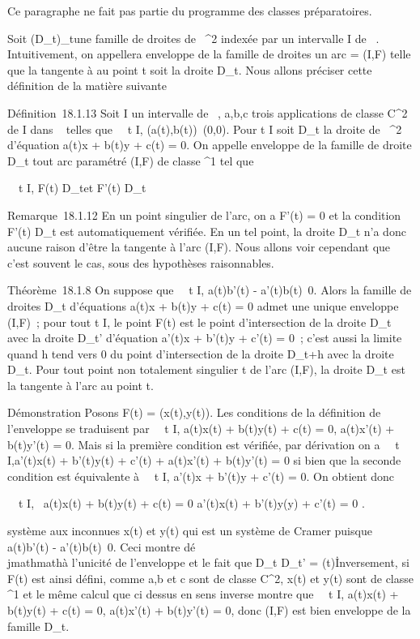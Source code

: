 \documentclass[]{article}
\begin{document}
Ce paragraphe ne fait pas partie du programme des classes préparatoires.

Soit (D_t)_t\inI une famille de droites de
~^2 indexée par un intervalle I de ~. Intuitivement, on
appellera enveloppe de la famille de droites un arc \Gamma = (I,F) telle que
la tangente à \Gamma au point t soit la droite D_t. Nous allons
préciser cette définition de la matière suivante

Définition~18.1.13 Soit I un intervalle de ~, a,b,c trois applications
de classe C^2 de I dans ~ telles que
\forall~~t \in I,
(a(t),b(t))\neq~(0,0). Pour t \in I soit
D_t la droite de ~^2 d'équation a(t)x + b(t)y + c(t)
= 0. On appelle enveloppe de la famille de droite D_t tout arc
paramétré (I,F) de classe ^1 tel que

\forall~~t \in I, F(t) \in
D_t\text et F'(t)
\in\overrightarrow D_t

Remarque~18.1.12 En un point singulier de l'arc, on a F'(t) = 0 et la
condition F'(t) \in\overrightarrow D_t est
automatiquement vérifiée. En un tel point, la droite D_t n'a
donc aucune raison d'être la tangente à l'arc (I,F). Nous allons voir
cependant que c'est souvent le cas, sous des hypothèses raisonnables.

Théorème~18.1.8 On suppose que \forall~~t \in I,
a(t)b'(t) - a'(t)b(t)\neq~0. Alors la famille de
droites D_t d'équations a(t)x + b(t)y + c(t) = 0 admet une
unique enveloppe (I,F)~; pour tout t \in I, le point F(t) est le point
d'intersection de la droite D_t avec la droite D_t'
d'équation a'(t)x + b'(t)y + c'(t) = 0~; c'est aussi la limite quand h
tend vers 0 du point d'intersection de la droite D_t+h avec la
droite D_t. Pour tout point non totalement singulier t de l'arc
(I,F), la droite D_t est la tangente à l'arc au point t.

Démonstration Posons F(t) = (x(t),y(t)). Les conditions de la définition
de l'enveloppe se traduisent par \forall~~t \in I,
a(t)x(t) + b(t)y(t) + c(t) = 0, a(t)x'(t) + b(t)y'(t) = 0. Mais si la
première condition est vérifiée, par dérivation on a
\forall~~t \in I,a'(t)x(t) + b'(t)y(t) + c'(t) +
a(t)x'(t) + b(t)y'(t) = 0 si bien que la seconde condition est
équivalente à \forall~~t \in I, a'(t)x + b'(t)y + c'(t)
= 0. On obtient donc

\forall~~t \in I, \left
\ \cases a(t)x(t) + b(t)y(t) + c(t) =
0 \cr a'(t)x(t) + b'(t)y(y) + c'(t) = 0 
\right .

système aux inconnues x(t) et y(t) qui est un système de Cramer puisque
a(t)b'(t) - a'(t)b(t)\neq~0. Ceci montre dé\\jmathmathà
l'unicité de l'enveloppe et le fait que D_t \bigcap D_t' =
\F(t)\. Inversement, si F(t) est ainsi
défini, comme a,b et c sont de classe C^2, x(t) et y(t) sont
de classe ^1 et le même calcul que ci dessus en sens inverse
montre que \forall~~t \in I, a(t)x(t) + b(t)y(t) + c(t)
= 0, a(t)x'(t) + b(t)y'(t) = 0, donc (I,F) est bien enveloppe de la
famille D_t.
\end{document}
